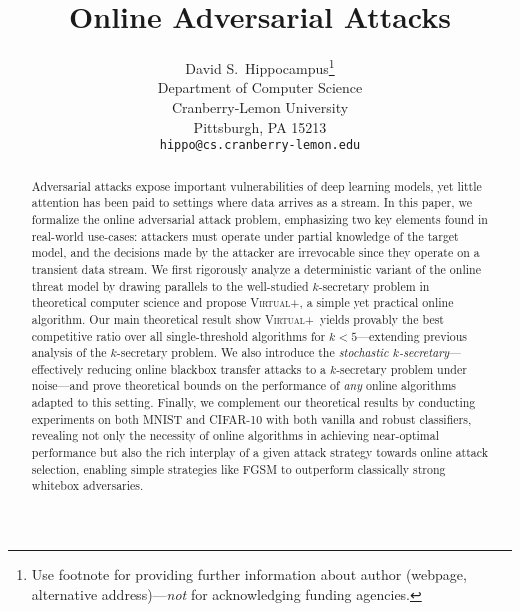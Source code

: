 \documentclass{article}
\title{Online Adversarial Attacks}
\author{%
  David S.~Hippocampus\thanks{Use footnote for providing further information
    about author (webpage, alternative address)---\emph{not} for acknowledging
    funding agencies.} \\
  Department of Computer Science\\
  Cranberry-Lemon University\\
  Pittsburgh, PA 15213 \\
  \texttt{hippo@cs.cranberry-lemon.edu} \\
}
\newcommand{\algoname}{\textsc{Virtual+}}
\begin{document}
\maketitle

\begin{abstract}
 Adversarial attacks expose important vulnerabilities of deep learning models, yet little attention has been paid to settings where data arrives as a stream. In this paper, we formalize the online adversarial attack problem, emphasizing two key elements found in real-world use-cases: attackers must operate under partial knowledge of the target model, and the decisions made by the attacker are irrevocable since they operate on a transient data stream. We first rigorously analyze a deterministic variant of the online threat model by drawing parallels to the well-studied $k$-secretary problem in theoretical computer science and propose \algoname, a simple yet practical online algorithm. Our main theoretical result show \algoname \ yields provably the best competitive ratio over all single-threshold algorithms for $k<5$---extending previous analysis of the $k$-secretary problem. We also introduce the \textit{stochastic $k$-secretary}---effectively reducing online blackbox transfer attacks to a $k$-secretary problem under noise---and prove theoretical bounds on the performance of \textit{any} online algorithms adapted to this setting. Finally, we complement our theoretical results by conducting experiments on both MNIST and CIFAR-10 with both vanilla and robust classifiers, revealing not only the necessity of online algorithms in achieving near-optimal performance but also the rich interplay of a given attack strategy towards online attack selection, enabling simple strategies like FGSM to outperform classically strong whitebox adversaries.
\end{abstract}









%
%
%

\clearpage


%

\end{document}

